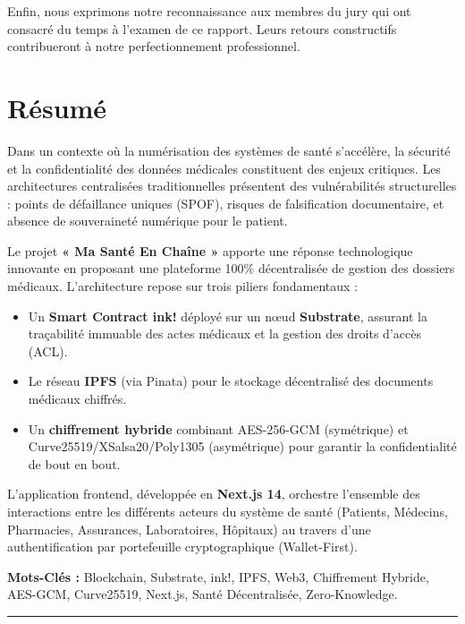 \documentclass[12pt,a4paper]{report}
\begin{document}
Enfin, nous exprimons notre reconnaissance aux membres du jury qui ont consacré du temps à l'examen de ce rapport. Leurs retours constructifs contribueront à notre perfectionnement professionnel.

\chapter*{Résumé}
Dans un contexte où la numérisation des systèmes de santé s'accélère, la sécurité et la confidentialité des données médicales constituent des enjeux critiques. Les architectures centralisées traditionnelles présentent des vulnérabilités structurelles : points de défaillance uniques (SPOF), risques de falsification documentaire, et absence de souveraineté numérique pour le patient.

Le projet \textbf{« Ma Santé En Chaîne »} apporte une réponse technologique innovante en proposant une plateforme 100\% décentralisée de gestion des dossiers médicaux. L'architecture repose sur trois piliers fondamentaux :
\begin{itemize}
    \item Un \textbf{Smart Contract ink!} déployé sur un nœud \textbf{Substrate}, assurant la traçabilité immuable des actes médicaux et la gestion des droits d'accès (ACL).
    \item Le réseau \textbf{IPFS} (via Pinata) pour le stockage décentralisé des documents médicaux chiffrés.
    \item Un \textbf{chiffrement hybride} combinant AES-256-GCM (symétrique) et Curve25519/XSalsa20/Poly1305 (asymétrique) pour garantir la confidentialité de bout en bout.
\end{itemize}

L'application frontend, développée en \textbf{Next.js 14}, orchestre l'ensemble des interactions entre les différents acteurs du système de santé (Patients, Médecins, Pharmacies, Assurances, Laboratoires, Hôpitaux) au travers d'une authentification par portefeuille cryptographique (Wallet-First).

\textbf{Mots-Clés :} Blockchain, Substrate, ink!, IPFS, Web3, Chiffrement Hybride, AES-GCM, Curve25519, Next.js, Santé Décentralisée, Zero-Knowledge.

\vspace{1cm}
\noindent\rule{\textwidth}{0.4pt}
\vspace{0.5cm}
\end{document}
